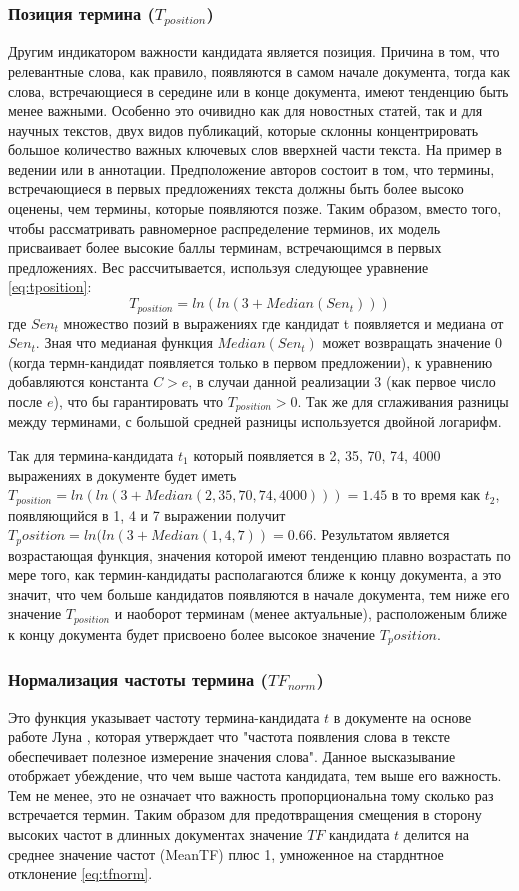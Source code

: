 \subsubsection{Позиция термина ($T_{position}$)}
Другим индикатором важности кандидата является позиция.
Причина в том, что релевантные слова, как правило, появляются в самом начале документа, тогда как слова, встречающиеся в середине или в конце документа, имеют тенденцию быть менее важными.
Особенно это очивидно как для новостных статей, так и для научных текстов, двух видов публикаций, которые склонны концентрировать большое количество важных ключевых слов вверхней части текста.
На пример в ведении или в аннотации.
Предположение авторов состоит в том, что термины, встречающиеся в первых предложениях текста должны быть более высоко оценены, чем термины, которые появляются позже. 
Таким образом, вместо того, чтобы рассматривать равномерное распределение терминов,
их модель присваивает более высокие баллы терминам, встречающимся в первых предложениях. 
Вес рассчитывается, используя следующее уравнение \eqref{eq:tposition}:
\begin{equation}
	\label{eq:tposition}
	T_{position} = ln(ln(3 + Median(Sen_t)))
\end{equation}
где $Sen_t$ множество позий в выражениях где кандидат t появляется и медиана от $Sen_t$.
Зная что медианая функция $Median(Sen_t)$ может возвращать значение 0 (когда термн-кандидат появляется только в первом предложении), к уравнению добавляются константа $C > e$, в случаи данной реализации 3 (как первое число после $e$), что бы гарантировать что $T_{position} > 0$.
Так же для сглаживания разницы между терминами, с большой средней разницы используется двойной логарифм.

Так для термина-кандидата $t_1$ который появляется в 2, 35, 70, 74, 4000 выражениях в документе будет иметь $T_{position} = ln(ln(3 + Median(2, 35, 70, 74, 4000))) = 1.45$ в то время как $t_2$, появляющийся в 1, 4 и 7 выражении получит $T_position = ln(ln(3 + Median(1, 4, 7)) = 0.66$.
Результатом является возрастающая функция, значения которой имеют тенденцию плавно возрастать по мере того, как термин-кандидаты располагаются ближе к концу документа, а это значит, что чем больше кандидатов появляются в начале документа, тем ниже его значение $T_{position}$ и наоборот терминам (менее актуальные), расположеным ближе к концу документа будет присвоено более высокое значение $T_position$.

\subsubsection{Нормализация частоты термина ($TF_{norm}$)}
Это функция указывает частоту  термина-кандидата $t$ в документе на основе работе Луна \cite{18}, которая утверждает что "частота появления слова в тексте обеспечивает полезное измерение значения слова".
Данное высказывание отобржает убеждение, что чем выше частота кандидата, тем выше его важность.
Тем не менее, это не означает что важность пропорциональна тому сколько раз встречается термин.
Таким образом для предотвращения смещения в сторону высоких частот в длинных документах значение $TF$ кандидата $t$ делится на среднее значение частот (MeanTF) плюс 1, умноженное на старднтное отклонение \eqref{eq:tfnorm}.

